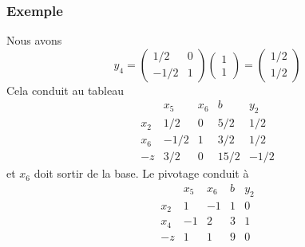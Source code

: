 \documentclass[usepdftitle=false]{beamer}
\begin{document}
\begin{frame}
\frametitle{Exemple}

Nous avons
\[
y_4 = 
\begin{pmatrix}
1/2 & 0 \\
-1/2 & 1
\end{pmatrix}
\begin{pmatrix}
1 \\ 1
\end{pmatrix}
=
\begin{pmatrix}
1/2 \\ 1/2
\end{pmatrix}
\]
Cela conduit au tableau
\[
\begin{matrix}
    & x_5 & x_6 & b & y_2 \\
x_2 & 1/2 & 0 & 5/2 & 1/2 \\
x_6 & -1/2 & 1 & 3/2 & 1/2 \\
-z & 3/2 & 0 & 15/2 & -1/2
\end{matrix}
\]
et $x_6$ doit sortir de la base. Le pivotage conduit à
\[
\begin{matrix}
    & x_5 & x_6 & b & y_2 \\
x_2 & 1 & -1 & 1 & 0 \\
x_4 & -1 & 2 & 3 & 1 \\
-z & 1 & 1 & 9 & 0
\end{matrix}
\]

\end{frame}
\end{document}
